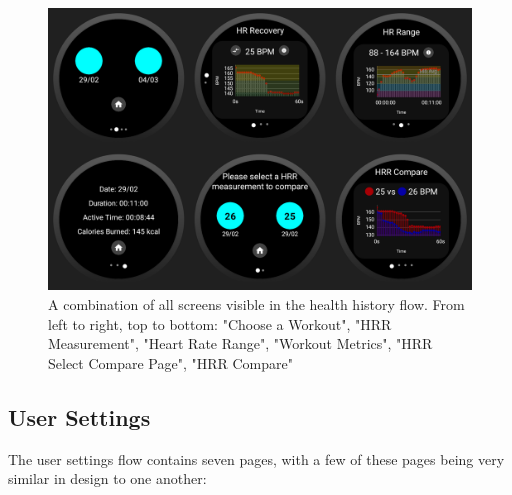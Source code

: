 \documentclass{l4proj}
\begin{document}
\begin{figure}[h!]
    \centering
    \includegraphics[width=0.88\linewidth]{dissertation//dissImages/HealthHistoryCombined.png}
    \caption{A combination of all screens visible in the health history flow. From left to right, top to bottom: "Choose a Workout", "HRR Measurement", "Heart Rate Range", "Workout Metrics", "HRR Select Compare Page", "HRR Compare"}
    \label{fig:healthhistorydesign}
\end{figure}

\subsection{User Settings}
\label{sec:usersettings}

The user settings flow contains seven pages, with a few of these pages being very similar in design to one another:
\end{document}
